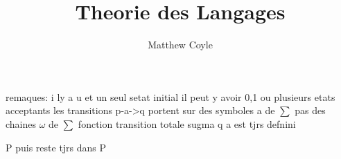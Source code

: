 \documentclass{article}
\author{Matthew Coyle}
\title{Theorie des Langages}
\begin{document}
remaques:
i ly a u et un seul setat initial
il peut y avoir 0,1 ou plusieurs etats acceptants
les transitions p-a->q portent sur des symboles a de $\sum$ pas des chaines $\omega$ de $\sum$
fonction transition totale
sugma q a est tjrs defnini

P puis reste tjrs dans P
\end{document}
